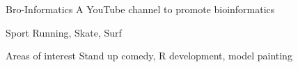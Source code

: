 
\begin{cvskills}

  \cvskill
    {Bro-Informatics} %
    {A YouTube channel to promote bioinformatics} %

  \cvskill
    {Sport} %
    {Running, Skate, Surf} %
    
  \cvskill
    {Areas of interest} %
    {Stand up comedy, R development, model painting} %
    
\end{cvskills}